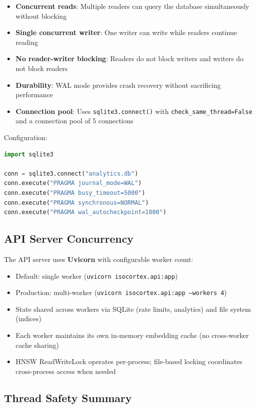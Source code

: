 \documentclass[11pt,a4paper]{article}
\newcommand{\inlinecode}[1]{\texttt{\small\colorbox{ctCodeBg}{#1}}}
\begin{document}
\begin{itemize}
    \item \textbf{Concurrent reads}: Multiple readers can query the database simultaneously without blocking
    \item \textbf{Single concurrent writer}: One writer can write while readers continue reading
    \item \textbf{No reader-writer blocking}: Readers do not block writers and writers do not block readers
    \item \textbf{Durability}: WAL mode provides crash recovery without sacrificing performance
    \item \textbf{Connection pool}: Uses \inlinecode{sqlite3.connect()} with \inlinecode{check\_same\_thread=False} and a connection pool of 5 connections
\end{itemize}

Configuration:
\begin{lstlisting}[language=Python]
import sqlite3

conn = sqlite3.connect("analytics.db")
conn.execute("PRAGMA journal_mode=WAL")
conn.execute("PRAGMA busy_timeout=5000")
conn.execute("PRAGMA synchronous=NORMAL")
conn.execute("PRAGMA wal_autocheckpoint=1000")
\end{lstlisting}

\subsection{API Server Concurrency}

The API server uses \textbf{Uvicorn} with configurable worker count:

\begin{itemize}
    \item Default: single worker (\inlinecode{uvicorn isocortex.api:app})
    \item Production: multi-worker (\inlinecode{uvicorn isocortex.api:app --workers 4})
    \item State shared across workers via SQLite (rate limits, analytics) and file system (indices)
    \item Each worker maintains its own in-memory embedding cache (no cross-worker cache sharing)
    \item HNSW ReadWriteLock operates per-process; file-based locking coordinates cross-process access when needed
\end{itemize}

\subsection{Thread Safety Summary}
\end{document}
